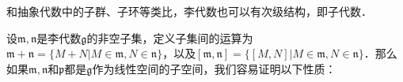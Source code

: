 



和抽象代数中的子群、子环等类比，李代数也可以有次级结构，即子代数．

设$\mathfrak{m}, \mathfrak{n}$是李代数$\mathfrak{g}$的非空子集，定义子集间的运算为$\mathfrak{m}+\mathfrak{n}=\{M+N|M\in\mathfrak{m}, N\in\mathfrak{n}\}$，以及$[\mathfrak{m}, \mathfrak{n}]=\{[M, N]|M\in\mathfrak{m}, N\in\mathfrak{n}\}$．那么如果$\mathfrak{m}, \mathfrak{n}$和$\mathfrak{p}$都是$\mathfrak{g}$作为线性空间的子空间，我们容易证明以下性质：





